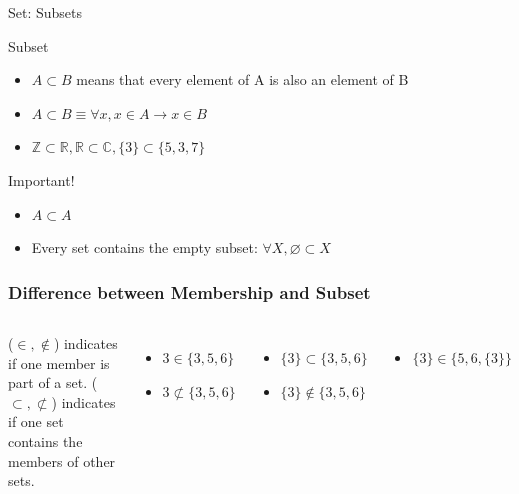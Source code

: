 \begin{frame}[t]{Set: Subsets}

  {\larger
  \begin{block}{Subset}
    \begin{itemize}
    \item $A \subset B$ means that every element of A is also an element of B
    \item $A\subset B \equiv \forall x, x\in A \rightarrow x\in B$
    \item $\mathbb{Z} \subset \mathbb{R}, \mathbb{R} \subset \mathbb{C}, \{3\} \subset \{5,3,7\}$
    \end{itemize}
  \end{block}

  \begin{block}{Important!}
    \begin{itemize}
    \item $A \subset A$
    \item Every set contains the empty subset: $\forall X, \varnothing \subset X$
    \end{itemize}
  \end{block}
  }
\end{frame}

\begin{frame}
  \frametitle{Difference between Membership and Subset}

  \begin{columns}[T]
     ($\in, \notin$) indicates if one member is part of a set.  ($\subset, \not\subset$) indicates if one set contains the members of other sets.

  {\larger
  \begin{itemize}
  \item $3 \in \{3,5,6\}$
  \item $3 \not\subset \{3,5,6\}$
  \end{itemize}
  \bigskip

  \begin{itemize}
  \item $\{3\} \subset \{3,5,6\}$
  \item $\{3\} \notin \{3,5,6\}$
  \end{itemize}
  \bigskip

  \begin{itemize}
    \item \alert{$\{3\} \in \{5, 6, \{3\}\}$}
  \end{itemize}
  }
  \end{columns}
\end{frame}


